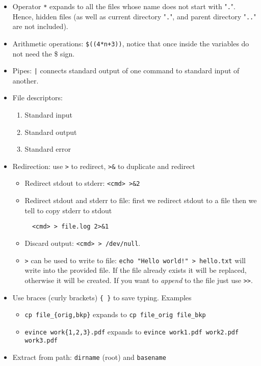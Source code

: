 \documentclass[a4paper,12pt,%
              final%
              ]{article}
\begin{document}
\begin{itemize}
  \item Operator \texttt{*} expands to all the files whose name does not start with "\texttt{.}". Hence, hidden files (as well as current directory "\texttt{.}", and parent directory "\texttt{..}" are not included).
  \item Arithmetic operations: \verb|$((4*n+3))|, notice that once inside the variables do not need the \$ sign.
  \item Pipes: \verb!|! connects standard output of one command to standard input of another.
  \item File descriptors:
    \begin{enumerate}[start=0]
      \item Standard input
      \item Standard output
      \item Standard error
    \end{enumerate}
  \item Redirection: use \verb|>| to redirect, \verb|>&| to duplicate and redirect
    \begin{itemize}
      \item Redirect stdout to stderr: \verb|<cmd> >&2|
      \item Redirect stdout and stderr to file: first we redirect stdout to a file then we tell to copy stderr to stdout
\begin{verbatim}
  <cmd> > file.log 2>&1
\end{verbatim}
      \item Discard output: \texttt{<cmd> > /dev/null}.
      \item \verb|>| can be used to write to file: \verb|echo "Hello world!" > hello.txt| will write into the provided file. If the file already exists it will be replaced, otherwise it will be created. If you want to \emph{append} to the file just use \texttt{>>}.
    \end{itemize}
  \item Use braces (curly brackets) \verb|{ }| to save typing. Examples
    \begin{itemize}
      \item \verb|cp file_{orig,bkp}| expands to \verb|cp file_orig file_bkp|
      \item \verb|evince work{1,2,3}.pdf| expands to \verb|evince work1.pdf work2.pdf work3.pdf|
    \end{itemize}
  \item Extract from path: \texttt{dirname} (root) and \texttt{basename}
\end{itemize}
\end{document}
